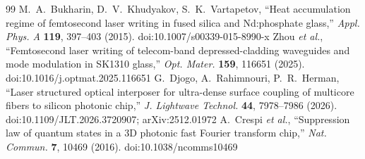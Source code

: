 \documentclass[10pt,a4paper]{article}
\begin{document}
\begin{thebibliography}{99}
 M.~A.~Bukharin, D.~V.~Khudyakov, S.~K.~Vartapetov, ``Heat accumulation regime of femtosecond laser writing in fused silica and Nd:phosphate glass,'' \emph{Appl. Phys. A} \textbf{119}, 397--403 (2015). doi:10.1007/s00339-015-8990-x
 Zhou \emph{et al.}, ``Femtosecond laser writing of telecom-band depressed-cladding waveguides and mode modulation in SK1310 glass,'' \emph{Opt. Mater.} \textbf{159}, 116651 (2025). doi:10.1016/j.optmat.2025.116651
 G.~Djogo, A.~Rahimnouri, P.~R.~Herman, ``Laser structured optical interposer for ultra-dense surface coupling of multicore fibers to silicon photonic chip,'' \emph{J. Lightwave Technol.} \textbf{44}, 7978--7986 (2026). doi:10.1109/JLT.2026.3720907; arXiv:2512.01972
 A.~Crespi \emph{et al.}, ``Suppression law of quantum states in a 3D photonic fast Fourier transform chip,'' \emph{Nat. Commun.} \textbf{7}, 10469 (2016). doi:10.1038/ncomms10469

\end{thebibliography}
\end{document}
